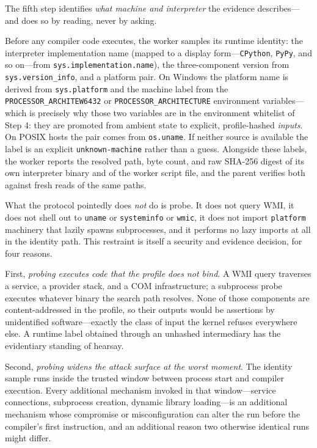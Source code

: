 The fifth step identifies \emph{what machine and interpreter} the evidence describes---and does so by reading, never by asking.

Before any compiler code executes, the worker samples its runtime identity: the interpreter implementation name (mapped to a display form---\texttt{CPython}, \texttt{PyPy}, and so on---from \texttt{sys.implementation.name}), the three-component version from \texttt{sys.version\_info}, and a platform pair. On Windows the platform name is derived from \texttt{sys.platform} and the machine label from the \texttt{PROCESSOR\_ARCHITEW6432} or \texttt{PROCESSOR\_ARCHITECTURE} environment variables---which is precisely why those two variables are in the environment whitelist of Step 4: they are promoted from ambient state to explicit, profile-hashed \emph{inputs}. On POSIX hosts the pair comes from \texttt{os.uname}. If neither source is available the label is an explicit \texttt{unknown-machine} rather than a guess. Alongside these labels, the worker reports the resolved path, byte count, and raw SHA-256 digest of its own interpreter binary and of the worker script file, and the parent verifies both against fresh reads of the same paths.

What the protocol pointedly does \emph{not} do is probe. It does not query WMI, it does not shell out to \texttt{uname} or \texttt{systeminfo} or \texttt{wmic}, it does not import \texttt{platform} machinery that lazily spawns subprocesses, and it performs no lazy imports at all in the identity path. This restraint is itself a security and evidence decision, for four reasons.

First, \emph{probing executes code that the profile does not bind}. A WMI query traverses a service, a provider stack, and a COM infrastructure; a subprocess probe executes whatever binary the search path resolves. None of those components are content-addressed in the profile, so their outputs would be assertions by unidentified software---exactly the class of input the kernel refuses everywhere else. A runtime label obtained through an unhashed intermediary has the evidentiary standing of hearsay.

Second, \emph{probing widens the attack surface at the worst moment}. The identity sample runs inside the trusted window between process start and compiler execution. Every additional mechanism invoked in that window---service connections, subprocess creation, dynamic library loading---is an additional mechanism whose compromise or misconfiguration can alter the run before the compiler's first instruction, and an additional reason two otherwise identical runs might differ.

